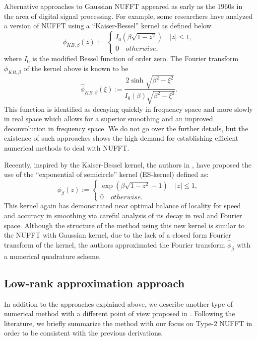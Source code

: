 Alternative approaches to Gaussian NUFFT appeared as early as the $1960$s in the area of digital signal processing.
For example, some researchers have analyzed a version of NUFFT using a ``Kaiser-Bessel'' kernel \cite{Book-Kaiser} as defined below
\begin{equation}
  \phi_{KB,\beta}(z) :=
  \begin{cases}
    I_{0}\left(\beta\sqrt{1-z^2}\right) \quad |z| \le 1,\\
    0 \quad otherwise,
  \end{cases}
  \label{eq:KB-kernel}
\end{equation}
where $I_{0}$ is the modified Bessel function of order zero.
The Fourier transform $\phi_{KB,\beta}$ of the kernel above is known to be
\begin{equation}
  \hat{\phi}_{KB,\beta}(\xi) :=
  \frac{2\sinh\sqrt{\beta^2-\xi^2}}{I_{0}(\beta)\sqrt{\beta^2-\xi^2}}.
  \label{eq:FT-KB-kernel}
\end{equation}
This function is identified as decaying quickly in frequency space and more slowly in real space which allows for a superior smoothing and an improved deconvolution in frequency space.
We do not go over the further details, but the existence of such approaches shows the high demand for establishing efficient numerical methods to deal with NUFFT.

Recently, inspired by the Kaiser-Bessel kernel, the authors in \cite{SISC-2019-Barnett}, \cite{IEEE-2021-Barnett} have proposed the use of the ``exponential of semicircle'' kernel (ES-kernel) defined as:
\begin{equation}
  \phi_{\beta}(z) :=
  \begin{cases}
    \exp\left(\beta\sqrt{1-z^2} - 1\right) \quad |z| \le 1,\\
    0 \quad otherwise.
  \end{cases}
  \label{eq:ES-kernel}
\end{equation}
This kernel again has demonstrated near optimal balance of locality for speed and accuracy in smoothing via careful analysis of its decay in real and Fourier space.
Although the structure of the method using this new kernel is similar to the NUFFT with Gaussian kernel, due to the lack of a closed form Fourier transform of the kernel, the authors approximated the Fourier transform $\hat{\phi}_{\beta}$ with a numerical quadrature scheme.

\subsection{Low-rank approximation approach}
In addition to the approaches explained above, we describe another type of numerical method with a different point of view proposed in \cite{SISC-2018-Townsend}.
Following the literature, we briefly summarize the method with our focus on Type-$2$ NUFFT in order to be consistent with the previous derivations.

